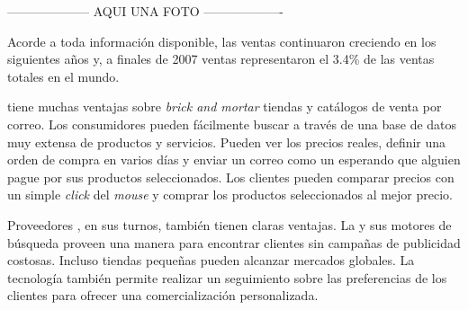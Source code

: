 -------------------- AQUI UNA FOTO -------------------

Acorde a toda información disponible, las ventas \ecommerce continuaron creciendo en los siguientes años y, a finales de 2007 ventas \ecommerce representaron el 3.4\% de las ventas totales en el mundo.

\ecommerce tiene muchas ventajas sobre \textit{brick and mortar} tiendas y catálogos de venta por correo. Los consumidores pueden fácilmente buscar a través de una base de datos muy extensa de productos y servicios. Pueden ver los precios reales, definir una orden de compra en varios días y enviar un correo como un \wishlist esperando que alguien pague por sus productos seleccionados. Los clientes pueden comparar precios con un simple \textit{click} del \textit{mouse} y comprar los productos seleccionados al mejor precio.

Proveedores \online, en sus turnos, también tienen claras ventajas. La \web y sus motores de búsqueda proveen una manera para encontrar clientes sin campañas de publicidad costosas. Incluso tiendas \online pequeñas pueden alcanzar mercados globales. 
La tecnología \web también permite realizar un seguimiento sobre las preferencias de los clientes para ofrecer una comercialización personalizada.

